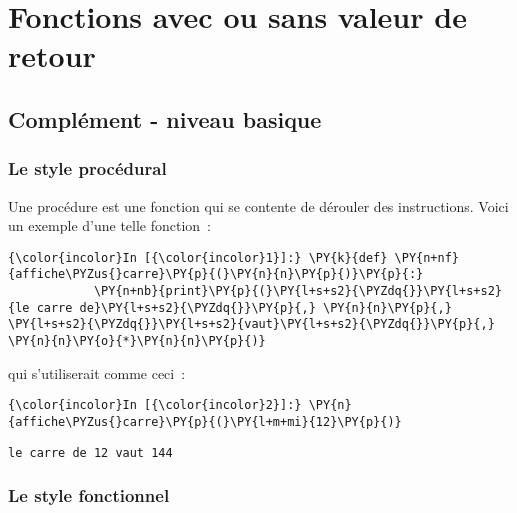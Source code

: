     
    
    
    

    

    \hypertarget{fonctions-avec-ou-sans-valeur-de-retour}{%
\section{Fonctions avec ou sans valeur de
retour}\label{fonctions-avec-ou-sans-valeur-de-retour}}

    \hypertarget{compluxe9ment---niveau-basique}{%
\subsection{Complément - niveau
basique}\label{compluxe9ment---niveau-basique}}

    \hypertarget{le-style-procuxe9dural}{%
\subsubsection{Le style procédural}\label{le-style-procuxe9dural}}

    Une procédure est une fonction qui se contente de dérouler des
instructions. Voici un exemple d'une telle fonction~:

    \begin{Verbatim}[commandchars=\\\{\}]
{\color{incolor}In [{\color{incolor}1}]:} \PY{k}{def} \PY{n+nf}{affiche\PYZus{}carre}\PY{p}{(}\PY{n}{n}\PY{p}{)}\PY{p}{:}
            \PY{n+nb}{print}\PY{p}{(}\PY{l+s+s2}{\PYZdq{}}\PY{l+s+s2}{le carre de}\PY{l+s+s2}{\PYZdq{}}\PY{p}{,} \PY{n}{n}\PY{p}{,} \PY{l+s+s2}{\PYZdq{}}\PY{l+s+s2}{vaut}\PY{l+s+s2}{\PYZdq{}}\PY{p}{,} \PY{n}{n}\PY{o}{*}\PY{n}{n}\PY{p}{)}
\end{Verbatim}


    qui s'utiliserait comme ceci~:

    \begin{Verbatim}[commandchars=\\\{\}]
{\color{incolor}In [{\color{incolor}2}]:} \PY{n}{affiche\PYZus{}carre}\PY{p}{(}\PY{l+m+mi}{12}\PY{p}{)}
\end{Verbatim}


    \begin{Verbatim}[commandchars=\\\{\}]
le carre de 12 vaut 144

    \end{Verbatim}

    \hypertarget{le-style-fonctionnel}{%
\subsubsection{Le style fonctionnel}\label{le-style-fonctionnel}}

